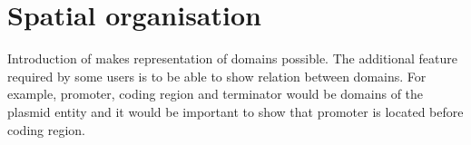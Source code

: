 \section{Spatial organisation}\label{sec:spacial}

Introduction of  makes representation of domains possible. The additional feature required by some users is to be able to show relation between domains. For example, promoter, coding region and terminator would be domains of the plasmid entity and it would be important to show that promoter is located before coding region. 


